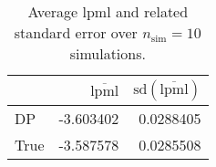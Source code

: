 \begin{table}[H]

\caption{Average lpml and related standard error over $n_{\text{sim}} = 10$ simulations.}
\centering
\begin{tabular}[t]{lrr}
\toprule
  & $\overbar{\text{lpml}}$ & $\text{sd}(\overbar{\text{lpml}})$\\
\midrule
DP & -3.603402 & 0.0288405\\
True & -3.587578 & 0.0285508\\
\bottomrule
\end{tabular}
\end{table}
